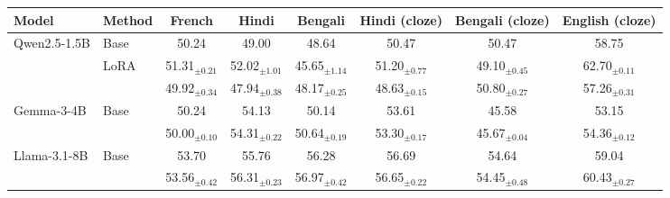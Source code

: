   \footnotesize\setlength{\tabcolsep}{4pt}
  \begin{tabular}{@{}llcccccc@{}}
    \toprule
    Model & Method & French & Hindi & Bengali & Hindi (cloze) & Bengali (cloze) & English (cloze) \\
    \midrule
    Qwen2.5-1.5B & Base & 50.24 & 49.00 & 48.64 & 50.47 & 50.47 & 58.75 \\
     & LoRA & 51.31$_{\pm 0.21}$ & 52.02$_{\pm 1.01}$ & 45.65$_{\pm 1.14}$ & 51.20$_{\pm 0.77}$ & 49.10$_{\pm 0.45}$ & 62.70$_{\pm 0.11}$ \\
     & \PEAT{} & 49.92$_{\pm 0.34}$ & 47.94$_{\pm 0.38}$ & 48.17$_{\pm 0.25}$ & 48.63$_{\pm 0.15}$ & 50.80$_{\pm 0.27}$ & 57.26$_{\pm 0.31}$ \\
    \midrule
    Gemma-3-4B & Base & 50.24 & 54.13 & 50.14 & 53.61 & 45.58 & 53.15 \\
     & \PEAT{} & 50.00$_{\pm 0.10}$ & 54.31$_{\pm 0.22}$ & 50.64$_{\pm 0.19}$ & 53.30$_{\pm 0.17}$ & 45.67$_{\pm 0.04}$ & 54.36$_{\pm 0.12}$ \\
    \midrule
    Llama-3.1-8B & Base & 53.70 & 55.76 & 56.28 & 56.69 & 54.64 & 59.04 \\
     & \PEAT{} & 53.56$_{\pm 0.42}$ & 56.31$_{\pm 0.23}$ & 56.97$_{\pm 0.42}$ & 56.65$_{\pm 0.22}$ & 54.45$_{\pm 0.48}$ & 60.43$_{\pm 0.27}$ \\
    \bottomrule
  \end{tabular}

